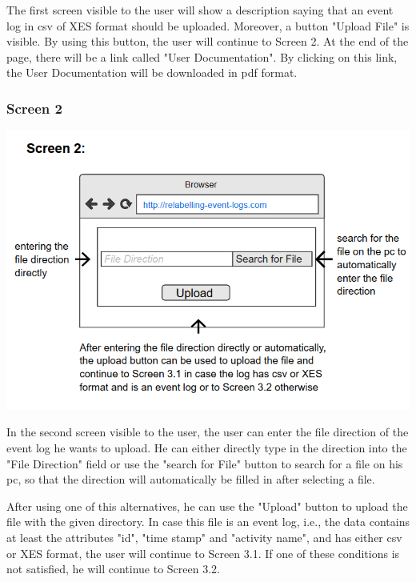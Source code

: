 \documentclass[notitlepage]{article}
\begin{document}
\begin{flushleft}
The first screen visible to the user will show a description saying that an event log in csv of XES format should be uploaded. Moreover, a button "Upload File" is visible. By using this button, the user will continue to Screen 2. At the end of the page, there will be a link called "User Documentation". By clicking on this link, the User Documentation will be downloaded in pdf format.
\subsubsection{Screen 2}

\includegraphics[scale=0.9]{InterfaceMockup2.png}

In the second screen visible to the user, the user can enter the file direction of the event log he wants to upload. He can either directly type in the direction into the "File Direction" field or use the "search for File" button to search for a file on his pc, so that the direction will automatically be filled in after selecting a file.

After using one of this alternatives, he can use the "Upload" button to upload the file with the given directory. In case this file is an event log, i.e., the data contains at least the attributes "id", "time stamp" and "activity name", and has either csv or XES format, the user will continue to Screen 3.1. If one of these conditions is not satisfied, he will continue to Screen 3.2. 



\end{flushleft}
\end{document}
